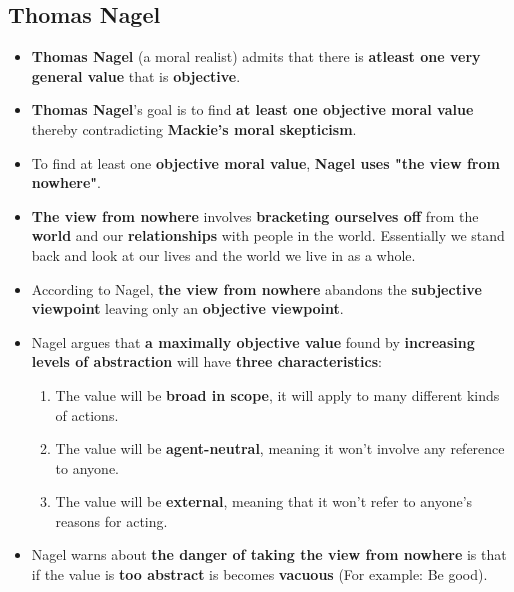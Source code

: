 \documentclass{article}
\begin{document}
    \subsection*{Thomas Nagel}
    \begin{itemize}
        \item \textbf{Thomas Nagel} (a moral realist) admits that there is \textbf{atleast one very general value} that is \textbf{objective}.
        \item \textbf{Thomas Nagel}'s goal is to find \textbf{at least one objective moral value} thereby contradicting \textbf{Mackie's moral skepticism}.
        \item To find at least one \textbf{objective moral value}, \textbf{Nagel uses "the view from nowhere"}.
        \item \textbf{The view from nowhere} involves \textbf{bracketing ourselves off} from the \textbf{world} and our \textbf{relationships} with people in the world. Essentially we stand back and look at our lives and the world we live in as a whole.
        \item According to Nagel, \textbf{the view from nowhere} abandons the \textbf{subjective viewpoint} leaving only an \textbf{objective viewpoint}.
        \item Nagel argues that \textbf{a maximally objective value} found by \textbf{increasing levels of abstraction} will have \textbf{three characteristics}:
        \begin{enumerate}
            \item The value will be \textbf{broad in scope}, it will apply to many different kinds of actions.
            \item The value will be \textbf{agent-neutral}, meaning it won't involve any reference to anyone.
            \item The value will be \textbf{external}, meaning that it won't refer to anyone's reasons for acting.
        \end{enumerate}
        \item Nagel warns about \textbf{the danger of taking the view from nowhere} is that if the value is \textbf{too abstract} is becomes \textbf{vacuous} (For example: Be good).
    \end{itemize}

    \section*{}
\end{document}
